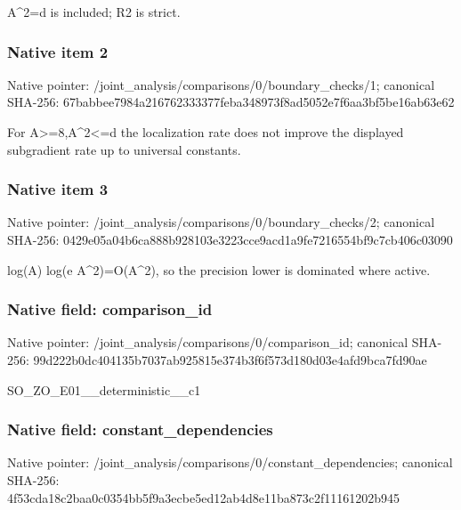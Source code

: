 \documentclass[10pt,a4paper]{article}
\begin{document}
\begingroup\raggedright\sloppy A\textasciicircum{}2=\allowbreak{}d is included;\allowbreak{} R2 is strict.\par\endgroup

\subsubsection{Native item 2}
Native pointer: /joint\_\allowbreak{}analysis/comparisons/0/boundary\_\allowbreak{}checks/1; canonical SHA-256: 67babbee7984a216762333377feba348973f8ad5052e7f6aa3bf5be16ab63e62

\begingroup\raggedright\sloppy For A>=\allowbreak{}8,\allowbreak{}A\textasciicircum{}2<=\allowbreak{}d the localization rate does not improve the displayed subgradient rate up to universal constants.\par\endgroup

\subsubsection{Native item 3}
Native pointer: /joint\_\allowbreak{}analysis/comparisons/0/boundary\_\allowbreak{}checks/2; canonical SHA-256: 0429e05a04b6ca888b928103e3223cce9acd1a9fe7216554bf9c7cb406c03090

\begingroup\raggedright\sloppy log(A) log(e A\textasciicircum{}2)=\allowbreak{}O(A\textasciicircum{}2),\allowbreak{} so the precision lower is dominated where active.\par\endgroup

\subsubsection{Native field: comparison\_\allowbreak{}id}
Native pointer: /joint\_\allowbreak{}analysis/comparisons/0/comparison\_\allowbreak{}id; canonical SHA-256: 99d222b0dc404135b7037ab925815e374b3f6f573d180d03e4afd9bca7fd90ae

\begingroup\raggedright\sloppy SO\_\allowbreak{}ZO\_\allowbreak{}E01\_\allowbreak{}\_\allowbreak{}deterministic\_\allowbreak{}\_\allowbreak{}c1\par\endgroup

\subsubsection{Native field: constant\_\allowbreak{}dependencies}
Native pointer: /joint\_\allowbreak{}analysis/comparisons/0/constant\_\allowbreak{}dependencies; canonical SHA-256: 4f53cda18c2baa0c0354bb5f9a3ecbe5ed12ab4d8e11ba873c2f11161202b945
\end{document}
